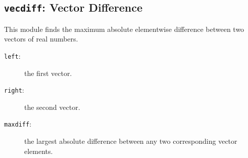 \subsection{{\tt{vecdiff}}: Vector Difference\label{s:toys-vecdiff}}

This module finds the maximum absolute elementwise difference between two vectors of real numbers.

{}

\begin{description}
\item[{\tt{left}}:]
	the first vector.
\item[{\tt{right}}:]
	the second vector.
\end{description}

{\outputspec}

\begin{description}
\item[{\tt{maxdiff}}:]
	the largest absolute difference between any two corresponding vector elements.
\end{description}
